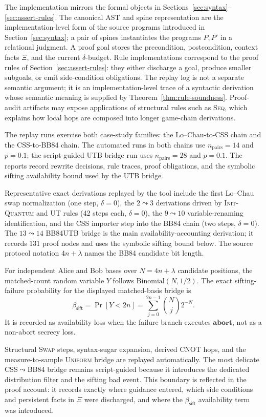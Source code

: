 \documentclass[conference,compsoc]{IEEEtran}
\newcommand{\bb}{\textsf{BB84}\xspace}
\begin{document}
The implementation mirrors the formal objects in Sections~\ref{sec:syntax}--\ref{sec:assert-rules}. The canonical AST and spine representation are the implementation-level form of the source programs introduced in Section~\ref{sec:syntax}; a pair of spines instantiates the programs \(P,P'\) in a relational judgment. A proof goal stores the precondition, postcondition, context facts \(\Xi\), and the current \(\delta\)-budget. Rule implementations correspond to the proof rules of Section~\ref{sec:assert-rules}: they either discharge a goal, produce smaller subgoals, or emit side-condition obligations. The replay log is not a separate semantic argument; it is an implementation-level trace of a syntactic derivation whose semantic meaning is supplied by Theorem~\ref{thm:rule-soundness}. Proof-audit artifacts may expose applications of structural rules such as \textsc{Seq}, which explains how local hops are composed into longer game-chain derivations.

The replay runs exercise both case-study families: the Lo--Chau-to-CSS chain and the CSS-to-\bb chain. The automated runs in both chains use \(n_{\mathrm{pairs}}=14\) and \(p=0.1\); the script-guided \textsc{UTB} bridge run uses \(n_{\mathrm{pairs}}=28\) and \(p=0.1\). The reports record rewrite decisions, rule traces, proof obligations, and the symbolic sifting availability bound used by the \textsc{UTB} bridge.

Representative exact derivations replayed by the tool include the first Lo--Chau swap normalization (one step, \(\delta=0\)), the \(2\leadsto3\) derivations driven by \textsc{Init-Quantum} and \textsc{UT} rules (42 steps each, \(\delta=0\)), the \(9\leadsto10\) variable-renaming identification, and the CSS importer step into the \bb chain (two steps, \(\delta=0\)). The \(13\leadsto14\) \bb \textsc{UTB} bridge is the main availability-accounting derivation; it records 131 proof nodes and uses the symbolic sifting bound below. The source protocol notation \(4n+\lambda\) names the \bb candidate bit length.

For independent Alice and Bob bases over \(N=4n+\lambda\) candidate positions, the matched-count random variable \(Y\) follows \(\mathrm{Binomial}(N,1/2)\). The exact sifting-failure probability for the displayed matched-basis bridge is
\[
\beta_{\mathsf{sift}}
=\Pr[Y<2n]
=\sum_{j=0}^{2n-1}\binom{N}{j}2^{-N}.
\]
It is recorded as availability loss when the failure branch executes
\(\mathbf{abort}\), not as a non-abort secrecy loss.

Structural \textsc{Swap} steps, syntax-sugar expansion, derived \textsc{CNOT} hops, and the measure-to-sample \textsc{Uniform} bridge are replayed automatically. The most delicate CSS$\leadsto$\bb bridge remains script-guided because it introduces the dedicated distribution filter and the sifting bad event. This boundary is reflected in the proof account: it records exactly where guidance entered, which side conditions and persistent facts in \(\Xi\) were discharged, and where the \(\beta_{\mathsf{sift}}\) availability term was introduced.
\end{document}
